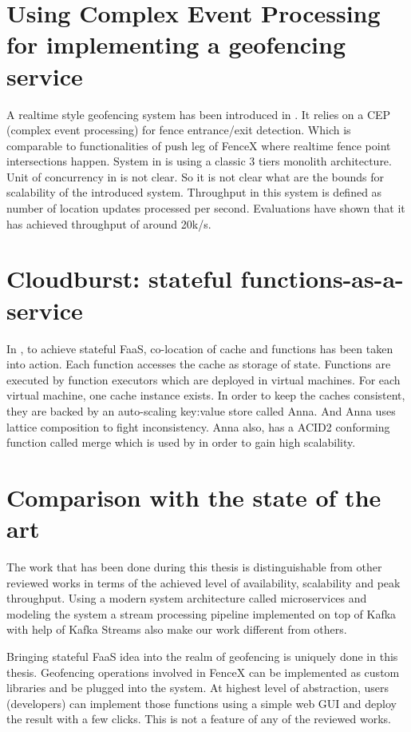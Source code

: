 \documentclass[a4]{report}
\begin{document}
    \section{Using Complex Event Processing for implementing a geofencing service}
    A realtime style geofencing system has been introduced in \cite{Nechifor_Comnac_2013}.
    It relies on a CEP (complex event processing) for fence entrance/exit detection.
    Which is comparable to functionalities of push leg of FenceX where realtime fence point intersections happen.
    System in \cite{Nechifor_Comnac_2013} is using a classic 3 tiers monolith architecture.
    Unit of concurrency in \cite{Nechifor_Comnac_2013} is not clear.
    So it is not clear what are the bounds for scalability of the introduced system.
    Throughput in this system is defined as number of location updates processed per second.
    Evaluations have shown that it has achieved throughput of around 20k/s.


    \section{Cloudburst: stateful functions-as-a-service}
    In \cite{Functions-as-a-Service-2020}, to achieve stateful FaaS, co-location of cache and functions has been
    taken into action.
    Each function accesses the cache as storage of state.
    Functions are executed by function executors which are deployed in virtual machines.
    For each virtual machine, one cache instance exists.
    In order to keep the caches consistent, they are backed by an auto-scaling key:value store called Anna.
    And Anna uses lattice composition to fight inconsistency.
    Anna also, has a ACID2 conforming function called merge which is used by \cite{Functions-as-a-Service-2020} in
    order to gain high scalability.


    \section{Comparison with the state of the art}
    The work that has been done during this thesis is distinguishable from other reviewed works in terms of the
    achieved level of availability, scalability and peak throughput.
    Using a modern system architecture called microservices and modeling the system a stream processing pipeline
    implemented on top of Kafka with help of Kafka Streams also make our work different from others.

    Bringing stateful FaaS idea into the realm of geofencing is uniquely done in this thesis.
    Geofencing operations involved in FenceX can be implemented as custom libraries and be plugged into the system.
    At highest level of abstraction, users (developers) can implement those functions using a simple web GUI and
    deploy the result with a few clicks.
    This is not a feature of any of the reviewed works.
\end{document}
